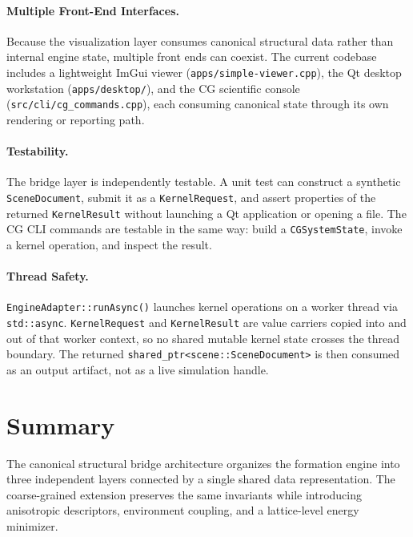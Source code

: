 ﻿\documentclass[11pt]{article}
\newcommand{\file}[1]{\texttt{#1}}
\newcommand{\type}[1]{\texttt{#1}}
\newcommand{\op}[1]{\texttt{#1}}
\begin{document}
\paragraph{Multiple Front-End Interfaces.}
Because the visualization layer consumes canonical structural data rather than
internal engine state, multiple front ends can coexist. The current codebase
includes a lightweight ImGui viewer (\file{apps/simple-viewer.cpp}),
the Qt desktop workstation (\file{apps/desktop/}), and the CG scientific
console (\file{src/cli/cg\_commands.cpp}), each consuming canonical state
through its own rendering or reporting path.

\paragraph{Testability.}
The bridge layer is independently testable. A unit test can construct a
synthetic \type{SceneDocument}, submit it as a \type{KernelRequest}, and
assert properties of the returned \type{KernelResult} without launching a Qt
application or opening a file. The CG CLI commands are testable in the same
way: build a \type{CGSystemState}, invoke a kernel operation, and inspect the
result.

\paragraph{Thread Safety.}
\op{EngineAdapter::runAsync()} launches kernel operations on a worker thread
via \op{std::async}. \type{KernelRequest} and \type{KernelResult} are value
carriers copied into and out of that worker context, so no shared mutable
kernel state crosses the thread boundary. The returned
\type{shared\_ptr<scene::SceneDocument>} is then consumed as an output
artifact, not as a live simulation handle.
\section{Summary}

The canonical structural bridge architecture organizes the formation engine
into three independent layers connected by a single shared data
representation. The coarse-grained extension preserves the same invariants
while introducing anisotropic descriptors, environment coupling, and a
lattice-level energy minimizer.
\end{document}

